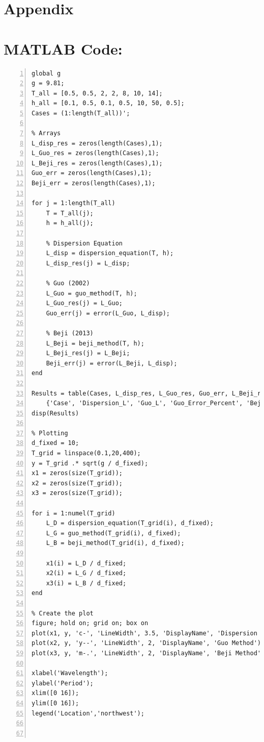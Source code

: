 \documentclass[a4paper, 11pt]{article}
\begin{document}
\appendix
\section{Appendix}

\section*{MATLAB Code:}
\begin{lstlisting}[frame=single, numbers=left, style=Matlab-Pyglike]
% Parameters
global g
g = 9.81;
T_all = [0.5, 0.5, 2, 2, 8, 10, 14];
h_all = [0.1, 0.5, 0.1, 0.5, 10, 50, 0.5];
Cases = (1:length(T_all))';

% Arrays
L_disp_res = zeros(length(Cases),1);
L_Guo_res = zeros(length(Cases),1);
L_Beji_res = zeros(length(Cases),1);
Guo_err = zeros(length(Cases),1);
Beji_err = zeros(length(Cases),1);

for j = 1:length(T_all)
    T = T_all(j);
    h = h_all(j); 

    % Dispersion Equation
    L_disp = dispersion_equation(T, h);
    L_disp_res(j) = L_disp;
    
    % Guo (2002)
    L_Guo = guo_method(T, h);
    L_Guo_res(j) = L_Guo;
    Guo_err(j) = error(L_Guo, L_disp);

    % Beji (2013)
    L_Beji = beji_method(T, h);
    L_Beji_res(j) = L_Beji;
    Beji_err(j) = error(L_Beji, L_disp);
end

Results = table(Cases, L_disp_res, L_Guo_res, Guo_err, L_Beji_res, Beji_err, 'VariableNames', ... 
    {'Case', 'Dispersion_L', 'Guo_L', 'Guo_Error_Percent', 'Beji_L', 'Beji_Error_Percent'});
disp(Results)

% Plotting
d_fixed = 10;
T_grid = linspace(0.1,20,400);
y = T_grid .* sqrt(g / d_fixed);
x1 = zeros(size(T_grid));
x2 = zeros(size(T_grid));
x3 = zeros(size(T_grid));

for i = 1:numel(T_grid)
    L_D = dispersion_equation(T_grid(i), d_fixed);
    L_G = guo_method(T_grid(i), d_fixed);
    L_B = beji_method(T_grid(i), d_fixed);

    x1(i) = L_D / d_fixed;
    x2(i) = L_G / d_fixed;
    x3(i) = L_B / d_fixed;
end

% Create the plot
figure; hold on; grid on; box on
plot(x1, y, 'c-', 'LineWidth', 3.5, 'DisplayName', 'Dispersion Equation');
plot(x2, y, 'y--', 'LineWidth', 2, 'DisplayName', 'Guo Method');
plot(x3, y, 'm-.', 'LineWidth', 2, 'DisplayName', 'Beji Method');

xlabel('Wavelength');
ylabel('Period');
xlim([0 16]);
ylim([0 16]);
legend('Location','northwest');



\end{lstlisting}
\end{document}
